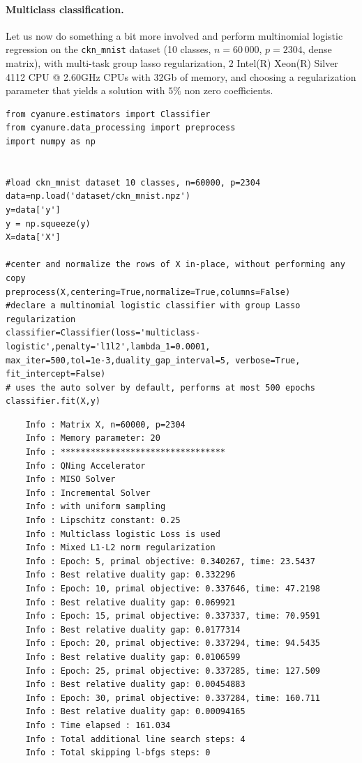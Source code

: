 \documentclass{article}
\begin{document}
\paragraph{Multiclass classification.}
Let us now do something a bit more involved and perform multinomial logistic regression on the
\texttt{ckn\_mnist} dataset (10 classes, $n=60\,000$, $p=2304$, dense matrix), with multi-task group lasso regularization,
2 Intel(R) Xeon(R) Silver 4112 CPU @ 2.60GHz CPUs with 32Gb of memory, and choosing a regularization parameter that yields a solution with $5\%$ non zero coefficients.
\begin{verbatim}
from cyanure.estimators import Classifier
from cyanure.data_processing import preprocess
import numpy as np


#load ckn_mnist dataset 10 classes, n=60000, p=2304
data=np.load('dataset/ckn_mnist.npz')
y=data['y']
y = np.squeeze(y)
X=data['X']

#center and normalize the rows of X in-place, without performing any copy
preprocess(X,centering=True,normalize=True,columns=False)
#declare a multinomial logistic classifier with group Lasso regularization
classifier=Classifier(loss='multiclass-logistic',penalty='l1l2',lambda_1=0.0001,
max_iter=500,tol=1e-3,duality_gap_interval=5, verbose=True, fit_intercept=False)
# uses the auto solver by default, performs at most 500 epochs
classifier.fit(X,y)
\end{verbatim}
\begin{verbatim}
    Info : Matrix X, n=60000, p=2304
    Info : Memory parameter: 20
    Info : *********************************
    Info : QNing Accelerator
    Info : MISO Solver
    Info : Incremental Solver
    Info : with uniform sampling
    Info : Lipschitz constant: 0.25
    Info : Multiclass logistic Loss is used
    Info : Mixed L1-L2 norm regularization
    Info : Epoch: 5, primal objective: 0.340267, time: 23.5437
    Info : Best relative duality gap: 0.332296
    Info : Epoch: 10, primal objective: 0.337646, time: 47.2198
    Info : Best relative duality gap: 0.069921
    Info : Epoch: 15, primal objective: 0.337337, time: 70.9591
    Info : Best relative duality gap: 0.0177314
    Info : Epoch: 20, primal objective: 0.337294, time: 94.5435
    Info : Best relative duality gap: 0.0106599
    Info : Epoch: 25, primal objective: 0.337285, time: 127.509
    Info : Best relative duality gap: 0.00454883
    Info : Epoch: 30, primal objective: 0.337284, time: 160.711
    Info : Best relative duality gap: 0.00094165
    Info : Time elapsed : 161.034
    Info : Total additional line search steps: 4
    Info : Total skipping l-bfgs steps: 0
\end{verbatim}
\end{document}
